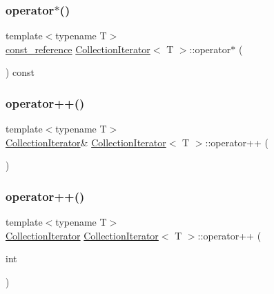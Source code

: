 \subsubsection{\texorpdfstring{operator$\ast$()}{operator*()}\hspace{0.1cm}{\footnotesize\ttfamily [2/2]}}
{\footnotesize\ttfamily template$<$typename T$>$ \\
\hyperlink{class_collection_iterator_ab0f0742da5375882a74038d82de41aca}{const\+\_\+reference} \hyperlink{class_collection_iterator}{Collection\+Iterator}$<$ T $>$\+::operator$\ast$ (\begin{DoxyParamCaption}{ }\end{DoxyParamCaption}) const\hspace{0.3cm}{\ttfamily [inline]}}

\mbox{\label{class_collection_iterator_aa570334105e0d8e3a46866a16bce3548}} 
\subsubsection{\texorpdfstring{operator++()}{operator++()}\hspace{0.1cm}{\footnotesize\ttfamily [1/2]}}
{\footnotesize\ttfamily template$<$typename T$>$ \\
\hyperlink{class_collection_iterator}{Collection\+Iterator}\& \hyperlink{class_collection_iterator}{Collection\+Iterator}$<$ T $>$\+::operator++ (\begin{DoxyParamCaption}{ }\end{DoxyParamCaption})\hspace{0.3cm}{\ttfamily [inline]}}

\mbox{\label{class_collection_iterator_a8349a131a3a073abc5e09c50f4c56824}} 
\subsubsection{\texorpdfstring{operator++()}{operator++()}\hspace{0.1cm}{\footnotesize\ttfamily [2/2]}}
{\footnotesize\ttfamily template$<$typename T$>$ \\
\hyperlink{class_collection_iterator}{Collection\+Iterator} \hyperlink{class_collection_iterator}{Collection\+Iterator}$<$ T $>$\+::operator++ (\begin{DoxyParamCaption}\item[{int}]{ }\end{DoxyParamCaption})\hspace{0.3cm}{\ttfamily [inline]}}

